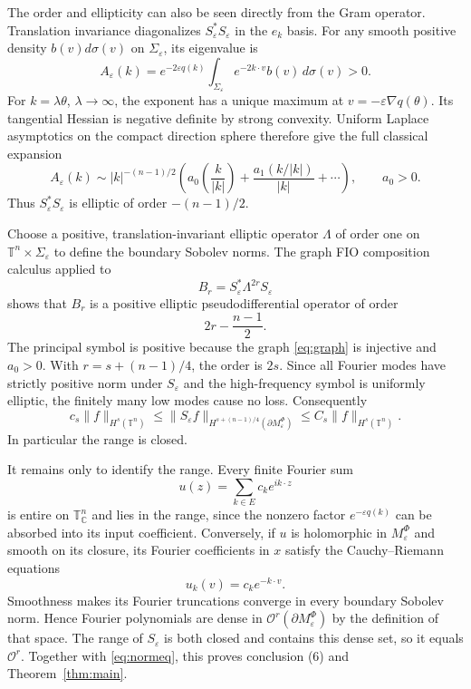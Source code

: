 \documentclass[11pt]{article}
\theoremstyle{remark}
\newcommand{\T}{\mathbb T}
\newcommand{\C}{\mathbb C}
\newcommand{\eps}{\varepsilon}
\newcommand{\cO}{\mathcal O}
\begin{document}
The order and ellipticity can also be seen directly from the Gram operator.
Translation invariance diagonalizes $S_\eps^*S_\eps$ in the $e_k$ basis.  For
any smooth positive density $b(v)d\sigma(v)$ on $\Sigma_\eps$, its eigenvalue
is
\begin{equation}\label{eq:gram}
A_\eps(k)=e^{-2\eps q(k)}
\int_{\Sigma_\eps}e^{-2k\cdot v}b(v)\,d\sigma(v)>0.
\end{equation}
For $k=\lambda\theta$, $\lambda\to\infty$, the exponent has a unique maximum
at $v=-\eps\nabla q(\theta)$.  Its tangential Hessian is negative definite by
strong convexity.  Uniform Laplace asymptotics on the compact direction sphere
therefore give the full classical expansion
\begin{equation}\label{eq:laplace}
A_\eps(k)\sim |k|^{-(n-1)/2}
\left(a_0\!\left(\frac{k}{|k|}\right)
+\frac{a_1(k/|k|)}{|k|}+\cdots\right),
\qquad a_0>0.
\end{equation}
Thus $S_\eps^*S_\eps$ is elliptic of order $-(n-1)/2$.

Choose a positive, translation-invariant elliptic operator $\Lambda$ of order
one on $\T^n\times\Sigma_\eps$ to define the boundary Sobolev norms.  The graph
FIO composition calculus applied to
\[
B_r=S_\eps^*\Lambda^{2r}S_\eps
\]
shows that $B_r$ is a positive elliptic pseudodifferential operator of order
\[
2r-\frac{n-1}{2}.
\]
The principal symbol is positive because the graph \eqref{eq:graph} is
injective and $a_0>0$.  With
$r=s+(n-1)/4$, the order is $2s$.  Since all Fourier modes have strictly
positive norm under $S_\eps$ and the high-frequency symbol is uniformly
elliptic, the finitely many low modes cause no loss.  Consequently
\begin{equation}\label{eq:normeq}
c_s\|f\|_{H^s(\T^n)}
\le \|S_\eps f\|_{H^{s+(n-1)/4}(\partial M^\Phi_\eps)}
\le C_s\|f\|_{H^s(\T^n)}.
\end{equation}
In particular the range is closed.

It remains only to identify the range.  Every finite Fourier sum
\[
u(z)=\sum_{k\in E}c_ke^{ik\cdot z}
\]
is entire on $\T^n_\C$ and lies in the range, since the nonzero factor
$e^{-\eps q(k)}$ can be absorbed into its input coefficient.  Conversely, if
$u$ is holomorphic in $M^\Phi_\eps$ and smooth on its closure, its Fourier
coefficients in $x$ satisfy the Cauchy--Riemann equations
\[
u_k(v)=c_ke^{-k\cdot v}.
\]
Smoothness makes its Fourier truncations converge in every boundary Sobolev
norm.  Hence Fourier polynomials are dense in
$\cO^r(\partial M^\Phi_\eps)$ by the definition of that space.  The range of
$S_\eps$ is both closed and contains this dense set, so it equals
$\cO^r$.  Together with \eqref{eq:normeq}, this proves conclusion (6) and
Theorem~\ref{thm:main}.
\end{document}
